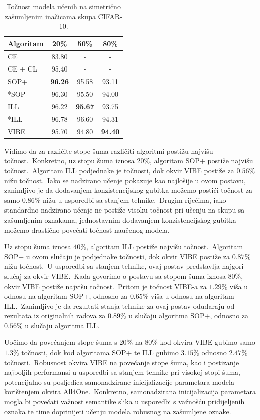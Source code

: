\documentclass[diplomskirad]{fer}
\begin{document}
\begin{table}[htb]
  \caption{Točnost modela učenih na simetrično zašumljenim inačicama skupa CIFAR-10.}
  \label{tbl:usporedba_simetricne}
  \centering
  \begin{tabular}{l||ccc}
  Algoritam & 20\% & 50\% & 80\% \\ \hline \hline
  CE & 83.80 & - & - \\
  CE + CL & 95.40 & - & - \\ \hline
  SOP+ & \textbf{96.26} & 95.58 & 93.11 \\
  *SOP+ & 96.30 & 95.50 & 94.00 \\
  ILL & 96.22 & \textbf{95.67} & 93.75 \\
  *ILL & 96.78 & 96.60 & 94.31 \\ \hline
  VIBE & 95.70 & 94.80 & \textbf{94.40} \\
  \end{tabular}
\end{table}

Vidimo da za različite stope šuma različiti algoritmi postižu najvišu točnost.\ 
Konkretno, uz stopu šuma iznosa $20\%$, algoritam SOP+ postiže najvišu točnost.\ Algoritam ILL podjednake je točnosti, dok okvir VIBE postiže za $0.56\%$ nižu točnost.\ 
Iako se nadzirano učenje pokazuje kao najlošije u ovom postavu, zanimljivo je da dodavanjem konzistencijskog gubitka možemo postići točnost za samo $0.86\%$ nižu u usporedbi sa stanjem tehnike.\ 
Drugim riječima, iako standardno nadzirano učenje ne postiže visoku točnost pri učenju na skupu sa zašumljenim oznakama, jednostavnim dodavanjem konzistencijskog gubitka možemo drastično povećati točnost naučenog modela.\ 

Uz stopu šuma iznosa $40\%$, algoritam ILL postiže najvišu točnost.\ Algoritam SOP+ u ovom slučaju je podjednake točnosti, dok okvir VIBE postiže za $0.87\%$ nižu točnost.\ U usporedbi sa stanjem tehnike, ovaj postav predstavlja najgori slučaj za okvir VIBE.\ 
Kada govorimo o postavu sa stopom šuma iznosa $80\%$, okvir VIBE postiže najvišu točnost.\ Pritom je točnost VIBE-a za $1.29\%$ viša u odnosu na algoritam SOP+, odnosno za $0.65\%$ viša u odnosu na algoritam ILL.\ 
Zanimljivo je da rezultati stanja tehnike za ovaj postav odudaraju od rezultata iz originalnih radova za $0.89\%$ u slučaju algoritma SOP+, odnosno za $0.56\%$ u slučaju algoritma ILL.\

Uočimo da povećanjem stope šuma s $20\%$ na $80\%$ kod okvira VIBE gubimo samo $1.3\%$ točnosti, dok kod algoritama SOP+ te ILL gubimo $3.15\%$ odnosno $2.47\%$ točnosti.\ 
Robusnost okvira VIBE na povećanje stope šuma, kao i postizanje najboljih performansi u usporedbi sa stanjem tehnike pri visokoj stopi šuma, potencijalno su posljedica samonadzirane inicijalizacije parametara modela korištenjem okvira All4One.\ 
Konkretno, samonadzirana inicijalizacija parametara mogla bi povećati važnost semantike slika u usporedbi s važnošću pridijeljenih oznaka te time doprinijeti učenju modela robusnog na zašumljene oznake.\
\end{document}
